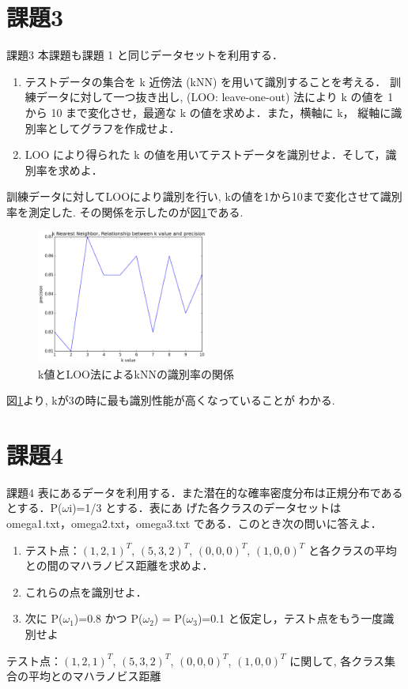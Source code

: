 \documentclass[10pt,a4paper,twocolumn]{jarticle}
\begin{document}
\section{課題3}
\begin{itembox}{課題3}
  本課題も課題 1 と同じデータセットを利用する．
  \begin{enumerate}
    \item テストデータの集合を k 近傍法 (kNN) を用いて識別することを考える． 訓練データに対して一つ抜き出し, (LOO: leave-one-out) 法により k の値を 1 から 10 まで変化させ，最適な k の値を求めよ．また，横軸に k， 縦軸に識別率としてグラフを作成せよ．
    \item LOO により得られた k の値を用いてテストデータを識別せよ．そして，識別率を求めよ．
  \end{enumerate}
\end{itembox}
訓練データに対してLOOにより識別を行い, kの値を1から10まで変化させて識別率を測定した. 
その関係を示したのが図\ref{fig:kadai3}である. 
\begin{figure}[htbp]
  \centering
  \includegraphics[width=0.5\textwidth]{./assets/kadai3_various_kvalue_20150121_231435.eps}
  \caption{k値とLOO法によるkNNの識別率の関係}
  \label{fig:kadai3}
\end{figure}
図\ref{fig:kadai3}より, kが3の時に最も識別性能が高くなっていることが
わかる. 
\section{課題4}
\begin{itembox}{課題4}
  表にあるデータを利用する．また潜在的な確率密度分布は正規分布であるとする．P($\omega$i)=1/3 とする．表にあ
  げた各クラスのデータセットは omega1.txt，omega2.txt，omega3.txt である．このとき次の問いに答えよ．

  \begin{enumerate}
    \item テスト点：$(1, 2, 1)^T$, $(5, 3, 2)^T$, $(0, 0, 0)^T$, $(1, 0, 0)^T$ と各クラスの平均との間のマハラノビス距離を求めよ．
    \item これらの点を識別せよ．
    \item 次に P($\omega_1$)=0.8 かつ P($\omega_2$) = P($\omega_3$)=0.1 と仮定し，テスト点をもう一度識別せよ
  \end{enumerate}
\end{itembox}
テスト点：$(1, 2, 1)^T$, $(5, 3, 2)^T$, $(0, 0, 0)^T$, $(1, 0, 0)^T$
に関して, 各クラス集合の平均とのマハラノビス距離
\end{document}
